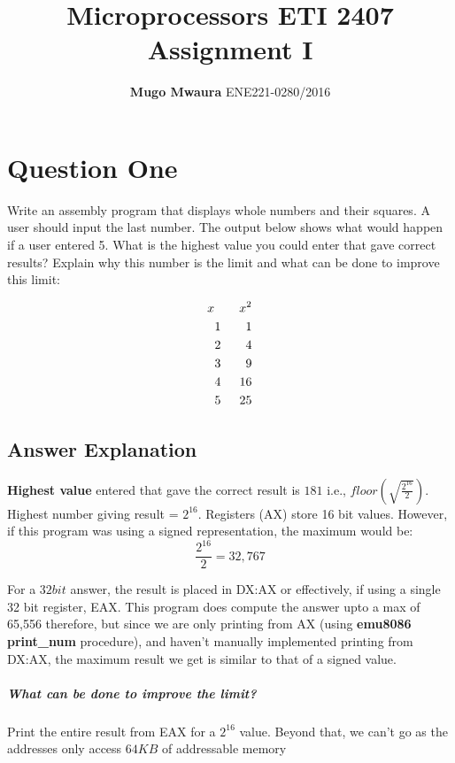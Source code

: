\documentclass[]{article}
\title{Microprocessors ETI 2407 \\
Assignment I}
\author{\textbf{Mugo Mwaura} 
	ENE221-0280/2016}
\date{August 31, 2020\endgraf\rule{\textwidth}{.9pt}}
\begin{document}
\maketitle



\section{Question One}


\justify
Write an assembly program that displays whole numbers and their squares. A user should
input the last number. The output below shows what would happen if a user entered 5. What
is the highest value you could enter that gave correct results? Explain why this number is the
limit and what can be done to improve this limit:


\begin{align*}
x \qquad x^2 \\
1 \qquad 1 \\
2 \qquad 4 \\
3\qquad 9 \\
4 \hspace*{1.5em} 16 \\
5\hspace*{1.5em} 25\\
\end{align*}

\subsection{Answer Explanation}

\textbf{Highest value} entered that gave the correct result is $181$ i.e., $floor\left(\sqrt{\frac{2^{16}}{2}}\right)$.
Highest number giving result = $2^{16}$.
Registers (AX) store 16 bit values. However, if this program was using a signed
representation, the maximum would be:
\begin{equation*}
\frac{2^{16}}{2} = 32,767
\end{equation*}


For a $32 bit$ answer, the result is placed in DX:AX or effectively, if using a single 32 bit register, EAX.
This program does compute the answer upto a max of 65,556 therefore,
but since we are only printing from AX (using \textbf{emu8086 print\_num} procedure), and haven't manually implemented
printing from DX:AX, the maximum result we get is similar to that of a signed value.


\subparagraph{What can be done to improve the limit?}
Print the entire result from EAX for a $2^{16}$ value. Beyond that, we can't go as the addresses
only access $64 KB$ of addressable memory
\end{document}
